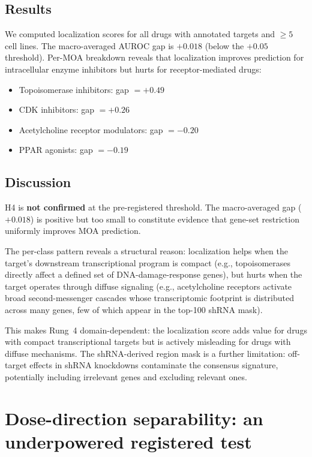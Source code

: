 \documentclass[11pt]{article}
\begin{document}
\subsection{Results}

We computed localization scores for all drugs with annotated targets
and $\geq 5$ cell lines.  The macro-averaged AUROC gap is $+0.018$
(below the $+0.05$ threshold).  Per-MOA breakdown reveals that
localization improves prediction for intracellular enzyme inhibitors
but hurts for receptor-mediated drugs:

\begin{itemize}
\item Topoisomerase inhibitors: gap $= +0.49$
\item CDK inhibitors: gap $= +0.26$
\item Acetylcholine receptor modulators: gap $= -0.20$
\item PPAR agonists: gap $= -0.19$
\end{itemize}

\subsection{Discussion}

H4 is \textbf{not confirmed} at the pre-registered threshold.
The macro-averaged gap ($+0.018$) is positive but too small to
constitute evidence that gene-set restriction uniformly improves MOA
prediction.

The per-class pattern reveals a structural reason: localization helps
when the target's downstream transcriptional program is compact (e.g.,
topoisomerases directly affect a defined set of DNA-damage-response
genes), but hurts when the target operates through diffuse signaling
(e.g., acetylcholine receptors activate broad second-messenger
cascades whose transcriptomic footprint is distributed across many
genes, few of which appear in the top-100 shRNA mask).

This makes Rung~4 domain-dependent: the localization score adds value
for drugs with compact transcriptional targets but is actively
misleading for drugs with diffuse mechanisms.  The shRNA-derived region
mask is a further limitation: off-target effects in shRNA knockdowns
contaminate the consensus signature, potentially including irrelevant
genes and excluding relevant ones.

\section{Dose-direction separability: an underpowered registered test}
\end{document}
